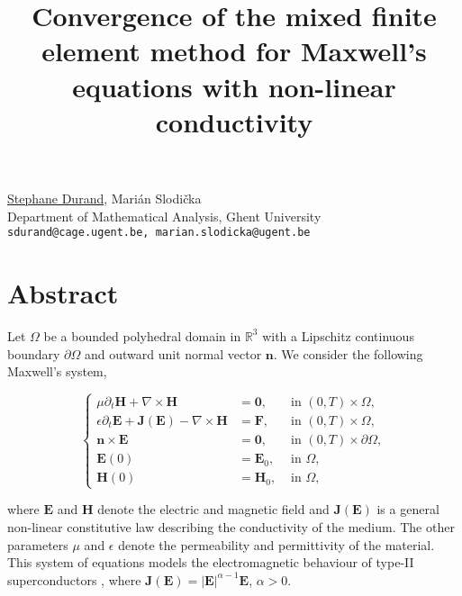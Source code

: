 \title{Convergence of the mixed finite element method for Maxwell's equations with non-linear conductivity}
\author{} \institute{}
\maketitle

\begin{center}
{\large \underline{Stephane Durand}, Mari\'{a}n Slodi\v{c}ka}\\
Department of Mathematical Analysis, Ghent University\\
{\tt sdurand@cage.ugent.be, marian.slodicka@ugent.be}
\end{center}

\section*{Abstract}
Let $\Omega$ be a bounded polyhedral domain in $\mathbb{R}^3$ with a Lipschitz continuous boundary $\partial \Omega$ and outward unit normal vector $\mathbf n$. We consider the following Maxwell's system,

\begin{equation}
\label{eq:system}
\left\{
\begin{array}{rllll}\displaystyle
\mu \partial_t \mathbf H + \nabla \times \mathbf H &=\mathbf 0,   &\mbox{ in } (0,T) \times \Omega,\\
\epsilon \partial_t \mathbf E + \mathbf J(\mathbf E) - \nabla \times \mathbf H &= \mathbf F, & \mbox{ in } (0,T) \times \Omega,\\
\mathbf n \times \mathbf E &= \mathbf 0,      &\mbox{ in } (0,T) \times \partial \Omega,\\
\mathbf E(0) &= \mathbf E_0,   &\mbox{ in } \Omega,\\
\mathbf H(0) &= \mathbf H_0,  &\mbox{ in } \Omega,
\end{array}
\right.
\end{equation}

where $\mathbf E$ and $\mathbf H$ denote the electric and magnetic field and $\mathbf J(\mathbf E)$ is a general non-linear constitutive law describing the conductivity of the medium. The other parameters $\mu$ and $\epsilon$ denote the permeability and permittivity of the material. This system of equations models the electromagnetic behaviour of type-II superconductors \cite{Slodicka.2008}, where $\mathbf J(\mathbf E) = |\mathbf E|^{\alpha-1} \mathbf E$, $\alpha >0$.


